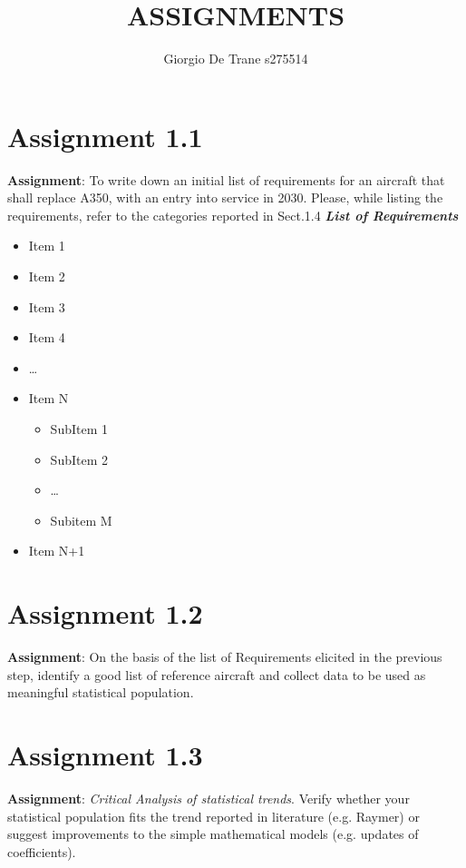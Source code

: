\documentclass{article}
\author{Giorgio De Trane s275514}
\title{ASSIGNMENTS}
\begin{document}
\maketitle

\section{Assignment 1.1}

\textbf{Assignment}: To write down an initial list of requirements for an
aircraft that shall replace A350, with an entry into service in 2030.
Please, while listing the requirements, refer to the categories
reported in Sect.1.4
\newline
\newline
\textbf{\textit{List of Requirements}}

\begin{itemize}
    \item Item 1
    \item Item 2
    \item Item 3
    \item Item 4
    \item \dots
    \item Item N
    \begin{itemize}
        \item SubItem 1 
        \item SubItem 2
        \item \dots
        \item Subitem M
    
    \end{itemize}
    \item Item N+1
\end{itemize}

\section{Assignment 1.2}
\textbf{Assignment}: On the basis of the list of Requirements elicited
in the previous step, identify a good list of reference aircraft and
collect data to be used as meaningful statistical population.

\section{Assignment 1.3}
\textbf{Assignment}: \textit{Critical Analysis of statistical trends}.
Verify whether your statistical population fits the trend reported in
literature (e.g. Raymer) or suggest improvements to the simple
mathematical models (e.g. updates of coefficients).
\end{document}
